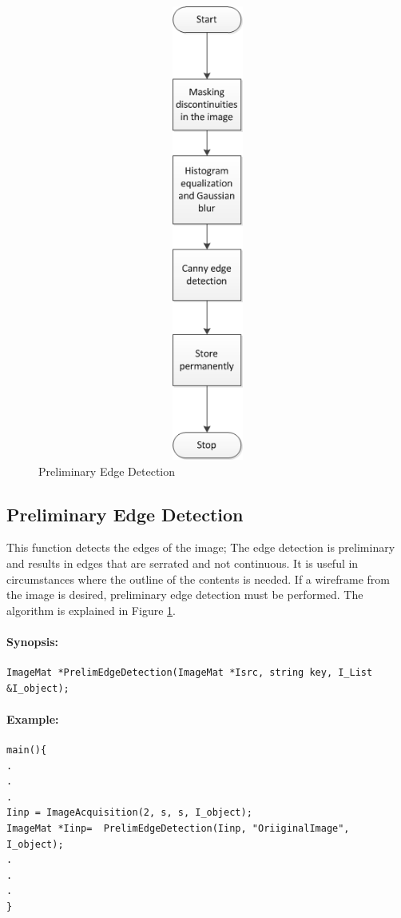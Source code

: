 \begin{figure} [ht]
\begin{minipage}[b]{0.45\linewidth}
	\includegraphics[width=15cm,height=15cm,keepaspectratio]{Pictures/prelimedgedetection}
    \caption{Preliminary Edge Detection}
    \label{fig:prelim}
	\end{minipage}
\end{figure}
\subsection{Preliminary Edge Detection}
 This function detects the edges of the image; The edge detection is preliminary and results in edges that are serrated and not continuous. It is useful in circumstances where the outline of the contents is needed. If a wireframe from the image is desired, preliminary edge detection must be performed. The algorithm is explained in Figure \ref{fig:prelim}.
\paragraph{Synopsis:}
\begin{lstlisting}
ImageMat *PrelimEdgeDetection(ImageMat *Isrc, string key, I_List &I_object);
\end{lstlisting}
\paragraph{Example:}
\begin{lstlisting}
main(){ 
.
.
.
Iinp = ImageAcquisition(2, s, s, I_object);
ImageMat *Iinp=  PrelimEdgeDetection(Iinp, "OriiginalImage", I_object);
.
.
.
}
\end{lstlisting}
